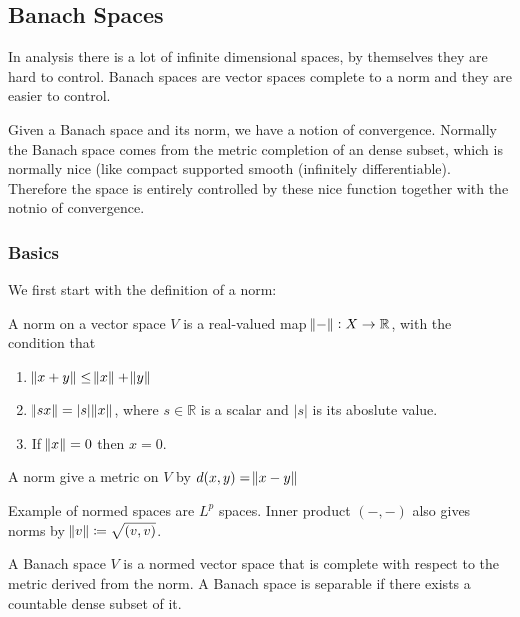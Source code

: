 \documentclass[main.tex]{subfiles}
\begin{document}
\subsection{Banach Spaces}
In analysis there is a lot of infinite dimensional spaces, by themselves they are hard to control. Banach spaces are vector spaces complete to a norm and they are easier to control. 

\begin{remark}
Given a Banach space and its norm, we have a notion of convergence. Normally the Banach space comes from the metric completion of an dense subset, which is normally nice (like compact supported smooth (infinitely differentiable). Therefore the space is entirely controlled by these nice function together with the notnio of convergence.
\end{remark}

\subsubsection{Basics}

We first start with the definition of a norm:

\begin{definition}
A norm on a vector space $V$ is a real-valued map $\norm{-} : X \rightarrow \mathbb{R}$, with the condition that 
\begin{enumerate}
    \item $\norm{x + y} \leq \norm{x} + \norm{y}$
    \item $\norm{s x} = |s| \norm{x}$, where $s \in \mathbb{R}$ is a scalar and $|s|$ is its aboslute value.
    \item If $\norm{x} = 0$ then $x = 0$.
\end{enumerate}

A norm give a metric on $V$ by $d(x, y) = \norm{x -y}$
\end{definition}

\begin{example}
Example of normed spaces are $L^p$ spaces. Inner product $(-,-)$ also gives norms by $\norm{v} \coloneqq \sqrt{(v,v)}$. 
\end{example}


\begin{definition}
A Banach space $V$ is a normed vector space that is complete with respect to the metric derived from the norm. A Banach space is separable if there exists a countable dense subset of it.
\end{definition}
\end{document}
